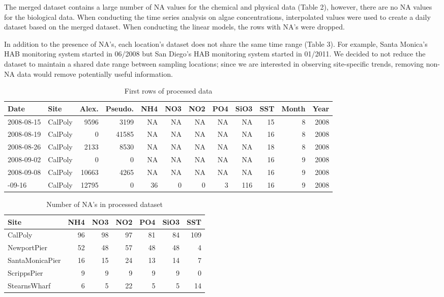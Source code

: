 \documentclass[
  12pt,
]{article}
\begin{document}
The merged dataset contains a large number of NA values for the chemical
and physical data (Table 2), however, there are no NA values for the
biological data. When conducting the time series analysis on algae
concentrations, interpolated values were used to create a daily dataset
based on the merged dataset. When conducting the linear models, the rows
with NA's were dropped.

In addition to the presence of NA's, each location's dataset does not
share the same time range (Table 3). For example, Santa Monica's HAB
monitoring system started in 06/2008 but San Diego's HAB monitoring
system started in 01/2011. We decided to not reduce the dataset to
maintain a shared date range between sampling locations; since we are
interested in observing site-specific trends, removing non-NA data would
remove potentially useful information.

\newpage

\begingroup\fontsize{10}{12}\selectfont

\begin{longtable}[t]{llrrrrrrrrrr}
\caption{\label{tab:prelim data analysis}First rows of processed data}\\
\toprule
Date & Site & Alex. & Pseudo. & NH4 & NO3 & NO2 & PO4 & SiO3 & SST & Month & Year\\
\midrule
2008-08-15 & CalPoly & 9596 & 3199 & NA & NA & NA & NA & NA & 15 & 8 & 2008\\
2008-08-19 & CalPoly & 0 & 41585 & NA & NA & NA & NA & NA & 16 & 8 & 2008\\
2008-08-26 & CalPoly & 2133 & 8530 & NA & NA & NA & NA & NA & 18 & 8 & 2008\\
2008-09-02 & CalPoly & 0 & 0 & NA & NA & NA & NA & NA & 16 & 9 & 2008\\
2008-09-08 & CalPoly & 10663 & 4265 & NA & NA & NA & NA & NA & 16 & 9 & 2008\\
\addlinespace
2008-09-16 & CalPoly & 12795 & 0 & 36 & 0 & 0 & 3 & 116 & 16 & 9 & 2008\\
\bottomrule
\end{longtable}
\endgroup{}

\begin{longtable}[t]{lrrrrrr}
\caption{\label{tab:prelim data analysis}Number of NA's in processed dataset}\\
\toprule
Site & NH4 & NO3 & NO2 & PO4 & SiO3 & SST\\
\midrule
CalPoly & 96 & 98 & 97 & 81 & 84 & 109\\
NewportPier & 52 & 48 & 57 & 48 & 48 & 4\\
SantaMonicaPier & 16 & 15 & 24 & 13 & 14 & 7\\
ScrippsPier & 9 & 9 & 9 & 9 & 9 & 0\\
StearnsWharf & 6 & 5 & 22 & 5 & 5 & 14\\
\bottomrule
\end{longtable}
\end{document}
